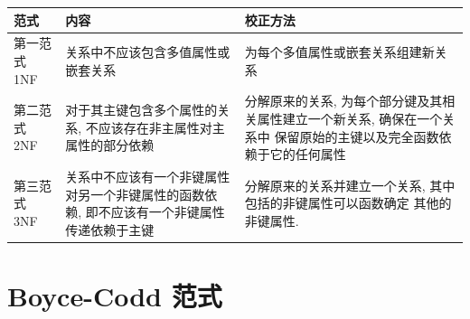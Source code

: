 \documentclass[10pt,UTF8]{book} %
\begin{document}
{ %
\label{基于主键的范式} %
\begin{longtable}{p{8em}p{14em}p{14em}}
    \hline
    \textbf{范式} & \textbf{内容} & \textbf{校正方法} \\
    \hline
    \endhead
    \hline
    \endfoot

    第一范式 1NF 
    & 关系中不应该包含多值属性或嵌套关系 
    & 为每个多值属性或嵌套关系组建新关系 \\
    第二范式 2NF
    & 对于其主键包含多个属性的关系, 不应该存在非主属性对主属性的部分依赖
    & 分解原来的关系, 为每个部分键及其相关属性建立一个新关系, 确保在一个关系中
    保留原始的主键以及完全函数依赖于它的任何属性 \\ 
    第三范式 3NF
    & 关系中不应该有一个非键属性对另一个非键属性的函数依赖,
    即不应该有一个非键属性传递依赖于主键 
    & 分解原来的关系并建立一个关系, 其中包括的非键属性可以函数确定
    其他的非键属性.
\end{longtable}}

\section{Boyce-Codd 范式}
\end{document}

